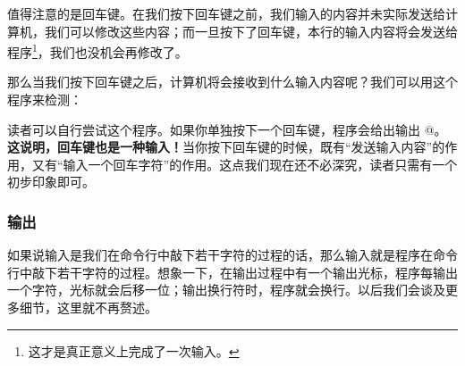 值得注意的是回车键。在我们按下回车键之前，我们输入的内容并未实际发送给计算机，我们可以修改这些内容；而一旦按下了回车键，本行的输入内容将会发送给程序\footnote{这才是真正意义上完成了一次输入。}，我们也没机会再修改了。\par
那么当我们按下回车键之后，计算机将会接收到什么输入内容呢？我们可以用这个程序来检测：
\par
读者可以自行尝试这个程序。如果你单独按下一个回车键，程序会给出输出 @。\textbf{这说明，回车键也是一种输入！}当你按下回车键的时候，既有``发送输入内容''的作用，又有``输入一个回车字符''的作用。这点我们现在还不必深究，读者只需有一个初步印象即可。\par
\subsubsection*{输出}
如果说输入是我们在命令行中敲下若干字符的过程的话，那么输入就是程序在命令行中敲下若干字符的过程。想象一下，在输出过程中有一个输出光标，程序每输出一个字符，光标就会后移一位；输出换行符时，程序就会换行。以后我们会谈及更多细节，这里就不再赘述。\par

